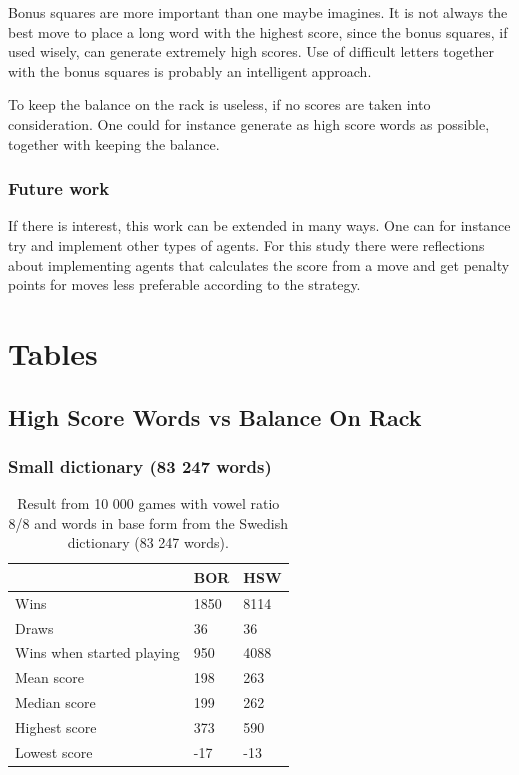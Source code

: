 \documentclass[a4paper, 12pt]{report}
\begin{document}
Bonus squares are more important than one maybe imagines. It is not always the best move to place a long word with the highest score, since the bonus squares, if used wisely, can generate extremely high scores. Use of difficult letters together with the bonus squares is probably an intelligent approach.

To keep the balance on the rack is useless, if no scores are taken into consideration. One could for instance generate as high score words as possible, together with keeping the balance.

\subsection{Future work}
If there is interest, this work can be extended in many ways. One can for instance try and implement other types of agents. For this study there were reflections about implementing agents that calculates the score from a move and get penalty points for moves less preferable according to the strategy. 

\appendix
\chapter{Tables}

\section{High Score Words vs Balance On Rack}
\subsection{Small dictionary (83 247 words)}
\begin{table}[h]
\centering
    \begin{tabular}{ l | l | l }
   	& BOR & HSW \\
   	\hline
   	Wins & 1850 & 8114 \\
	Draws & 36 & 36 \\
	Wins when started playing & 950 & 4088 \\   	
	Mean score & 198 & 263 \\
	Median score & 199 & 262\\	 	 
	Highest score & 373 & 590 \\
	Lowest score & -17 & -13 \\		
    \end{tabular}
\caption{Result from 10 000 games with vowel ratio 8/8 and words in base form from the Swedish dictionary (83 247 words).}
\label{tab:borhswstats8smallDict}
\end{table}
\end{document}
